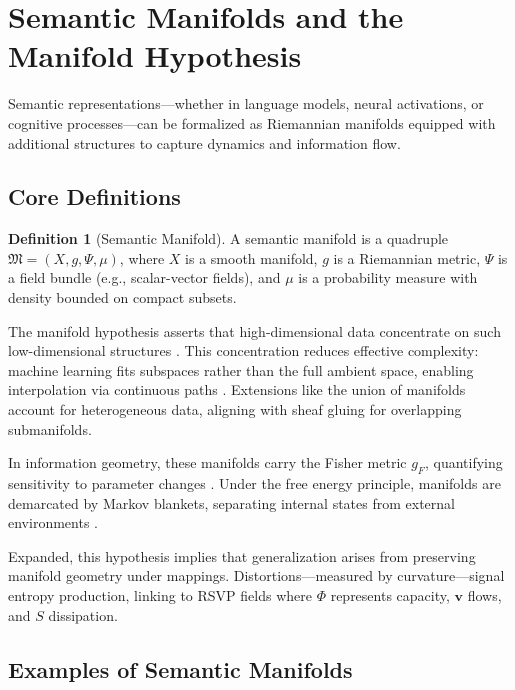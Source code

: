 \documentclass{article}
\theoremstyle{definition}
\newtheorem{definition}{Definition}[section]
\begin{document}
\section{Semantic Manifolds and the Manifold Hypothesis}

Semantic representations—whether in language models, neural activations, or cognitive processes—can be formalized as Riemannian manifolds equipped with additional structures to capture dynamics and information flow.

\subsection{Core Definitions}

\begin{definition}[Semantic Manifold]
A semantic manifold is a quadruple $\mathfrak{M} = (X, g, \Psi, \mu)$, where $X$ is a smooth manifold, $g$ is a Riemannian metric, $\Psi$ is a field bundle (e.g., scalar-vector fields), and $\mu$ is a probability measure with density bounded on compact subsets.
\end{definition}

The manifold hypothesis asserts that high-dimensional data concentrate on such low-dimensional structures \cite{fefferman2016testing,gorban2018blessing}. This concentration reduces effective complexity: machine learning fits subspaces rather than the full ambient space, enabling interpolation via continuous paths \cite{chollet2021deep}. Extensions like the union of manifolds \cite{brown2023union} account for heterogeneous data, aligning with sheaf gluing for overlapping submanifolds.

In information geometry, these manifolds carry the Fisher metric $g_F$, quantifying sensitivity to parameter changes \cite{caticha2015geometry}. Under the free energy principle, manifolds are demarcated by Markov blankets, separating internal states from external environments \cite{kirchhoff2018markov}.

Expanded, this hypothesis implies that generalization arises from preserving manifold geometry under mappings. Distortions—measured by curvature—signal entropy production, linking to RSVP fields where $\Phi$ represents capacity, $\mathbf{v}$ flows, and $S$ dissipation.

\subsection{Examples of Semantic Manifolds}
\end{document}
